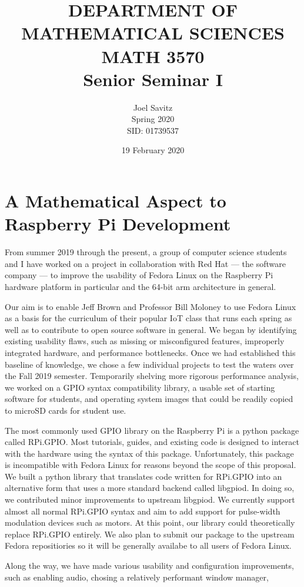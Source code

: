 \documentclass[12pt]{amsart}
\date{19 February 2020}
\title{DEPARTMENT OF MATHEMATICAL SCIENCES \protect\\
MATH 3570 \protect\\
Senior Seminar I}
\author{Joel Savitz \\ Spring 2020 \\ SID: 01739537}
\begin{document}
\maketitle

\section*{A Mathematical Aspect to Raspberry Pi Development}

From summer 2019 through the present, a group of computer science students and I have worked on a project in collaboration with Red Hat --- the software company --- to improve the usability of Fedora Linux on the Raspberry Pi hardware platform in particular and the 64-bit arm architecture in general.

Our aim is to enable Jeff Brown and Professor Bill Moloney to use Fedora Linux as a basis for the curriculum of their popular IoT class that runs each spring as well as to contribute to open source software in general.
We began by identifying existing usability flaws, such as missing or misconfigured features, improperly integrated hardware, and performance bottlenecks. Once we had established this baseline of knowledge, we chose a few individual projects to test the waters over the Fall 2019 semester. Temporarily shelving more rigorous performance analysis, we worked on a GPIO syntax compatibility library, a usable set of starting software for students, and operating system images that could be readily copied to microSD cards for student use.

The most commonly used GPIO library on the Raspberry Pi is a python package called RPi.GPIO. Most tutorials, guides, and existing code is designed to interact with the hardware using the syntax of this package. Unfortunately, this package is incompatible with Fedora Linux for reasons beyond the scope of this proposal. We built a python library that translates code written for RPi.GPIO into an alternative form that uses a more standard backend called libgpiod. In doing so, we contributed minor improvements to upstream libgpiod. We currently support almost all normal RPi.GPIO syntax and aim to add support for pulse-width modulation devices such as motors. At this point, our library could theoretically replace RPi.GPIO entirely. We also plan to submit our package to the upstream Fedora repositiories so it will be generally availabe to all users of Fedora Linux.

Along the way, we have made various usability and configuration improvements, such as enabling audio, chosing a relatively performant window manager, 
\end{document}
